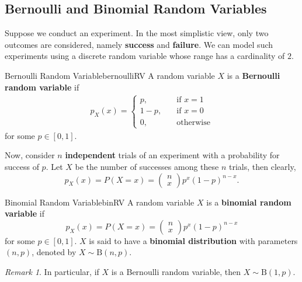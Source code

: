 \documentclass[math]{amznotes}
\theoremstyle{remark}
\newtheorem*{remark}{Remark}
\newcommand{\0}{\mathbf{0}}
\newcommand{\1}{\mathbf{1}}
\begin{document}
\subsection{Bernoulli and Binomial Random Variables}
Suppose we conduct an experiment. In the most simplistic view, only two outcomes are considered, namely \textbf{success} and \textbf{failure}. We can model such experiments using a discrete random variable whose range has a cardinality of $2$.
\begin{dfnbox}{Bernoulli Random Variable}{bernoulliRV}
    A random variable $X$ is a {\color{red} \textbf{Bernoulli random variable}} if
    \begin{align*}
        p_X(x) = \begin{cases}
            p, \quad & \textrm{if } x = 1 \\
            1 - p, \quad & \textrm{if } x = 0 \\
            0, \quad & \textrm{otherwise}
        \end{cases}
    \end{align*}
    for some $p \in [0, 1]$.
\end{dfnbox}
Now, consider $n$ \textbf{independent} trials of an experiment with a probability for success of $p$. Let $X$ be the number of successes among these $n$ trials, then clearly,
\begin{equation*}
    p_X(x) = P(X = x) = \begin{pmatrix}
        n \\
        x
    \end{pmatrix}p^x(1 - p)^{n - x}.
\end{equation*}
\begin{dfnbox}{Binomial Random Variable}{binRV}
    A random variable $X$ is a {\color{red} \textbf{binomial random variable}} if
    \begin{equation*}
        p_X(x) = P(X = x) = \begin{pmatrix}
            n \\
            x
        \end{pmatrix}p^x(1 - p)^{n - x}
    \end{equation*}
    for some $p \in [0, 1]$. $X$ is said to have a {\color{red} \textbf{binomial distribution}} with parameters $(n, p)$, denoted by $X \sim \mathrm{B}(n, p)$.
\end{dfnbox}
\begin{notebox}
    \begin{remark}
        In particular, if $X$ is a Bernoulli random variable, then $X \sim \mathrm{B}(1, p)$.
    \end{remark}
\end{notebox}
\end{document}
